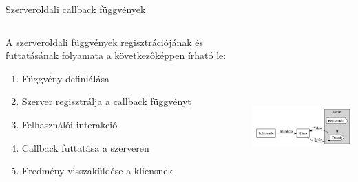 \documentclass[english, aspectratio=169]{beamer}
\begin{document}
\begin{frame}{Szerveroldali callback függvények}
	\begin{columns}
		\begin{column}{.5\textwidth}
				A szerveroldali függvények regisztrációjának és futtatásának folyamata a következőképpen írható le:
			\begin{enumerate}
				\item Függvény definiálása
				\item Szerver regisztrálja a callback függvényt
				\item Felhasználói interakció
				\item Callback futtatása a szerveren
				\item Eredmény visszaküldése a kliensnek
			\end{enumerate}
		\end{column}
		\begin{column}{.5\textwidth}
			\begin{center}
				\includegraphics[width=7cm, height=7cm, keepaspectratio]{graphs/adv_1.png}
			\end{center}	
		\end{column}
	\end{columns}
\end{frame}
\end{document}
